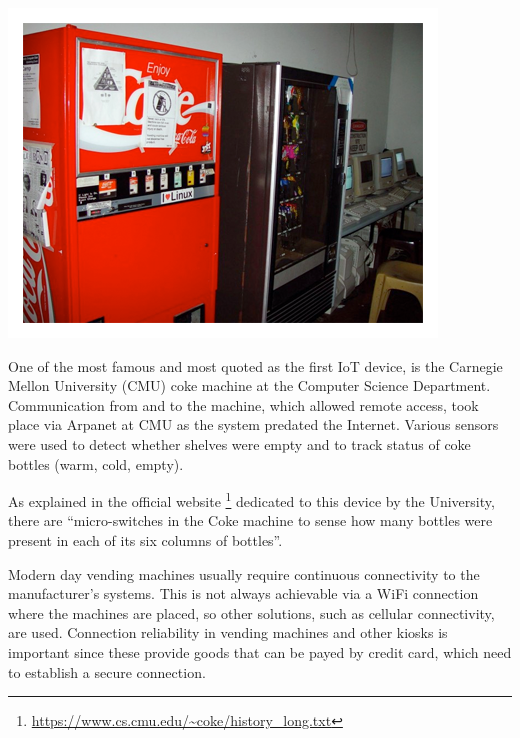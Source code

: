			\noindent
			\begin{minipage}{0.5\textwidth}%
				\centering
				\includegraphics[width=\textwidth]{resources/img/chap2/coke}
			\end{minipage}%
			\hfill%
			\begin{minipage}{0.5\textwidth}\raggedright
				One of the most famous and most quoted as the first IoT device, is the Carnegie Mellon University (CMU) coke machine at the Computer Science Department.
				Communication from and to the machine, which allowed remote access, took place via Arpanet at CMU as the system predated the Internet.
				Various sensors were used to detect whether shelves were empty and to track status of coke bottles (warm, cold, empty).
			\end{minipage}
			\newline
			
			As explained in the official website \footnote{\url{https://www.cs.cmu.edu/~coke/history_long.txt}} dedicated to this device by the University, there are ``micro-switches in the Coke machine to sense how many bottles were present in each of its six columns of bottles''.
		
			Modern day vending machines usually require continuous connectivity to the manufacturer's systems.
			This is not always achievable via a WiFi connection where the machines are placed, so other solutions, such as cellular connectivity, are used.
			Connection reliability in vending machines and other kiosks is important since these provide goods that can be payed by credit card, which need to establish a secure connection.
			
